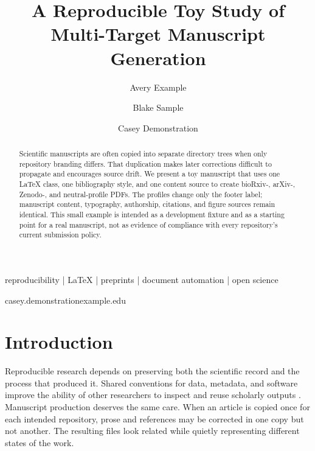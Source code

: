 \documentclass[times,twoside]{_Templates/MultiTargetManuscript}
\begin{document}
\raggedbottom
\setlength{\emergencystretch}{2em}

\title{A Reproducible Toy Study of Multi-Target Manuscript Generation}

\author[1]{Avery Example}
\author[1]{Blake Sample}
\author[1,\Letter]{Casey Demonstration}

\maketitle

\begin{abstract}
Scientific manuscripts are often copied into separate directory trees when only
repository branding differs. That duplication makes later corrections difficult
to propagate and encourages source drift. We present a toy manuscript that uses
one LaTeX class, one bibliography style, and one content source to create
bioRxiv-, arXiv-, Zenodo-, and neutral-profile PDFs. The profiles change only the
footer label; manuscript content, typography, authorship, citations, and figure
sources remain identical. This small example is intended as a development
fixture and as a starting point for a real manuscript, not as evidence of
compliance with every repository's current submission policy.
\end{abstract}

\begin{keywords}
reproducibility | LaTeX | preprints | document automation | open science
\end{keywords}

\begin{corrauthor}
casey.demonstration\at example.edu
\end{corrauthor}

\section*{Introduction}

Reproducible research depends on preserving both the scientific record and the
process that produced it. Shared conventions for data, metadata, and software
improve the ability of other researchers to inspect and reuse scholarly outputs
\cite{wilkinson2016fair}. Manuscript production deserves the same care. When an
article is copied once for each intended repository, prose and references may be
corrected in one copy but not another. The resulting files look related while
quietly representing different states of the work.
\end{document}
